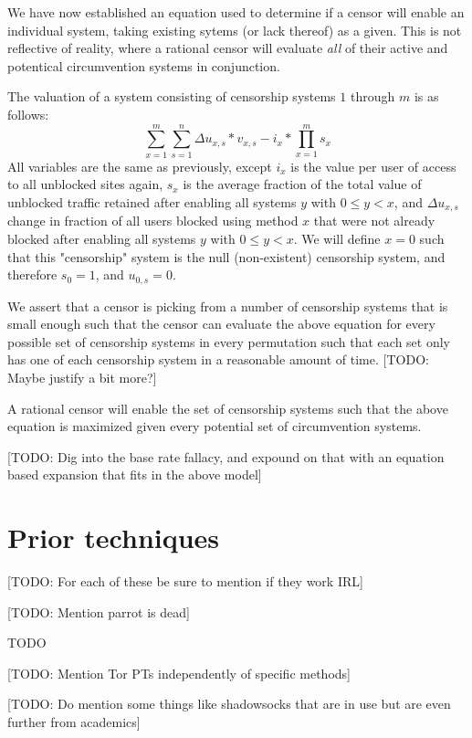 \documentclass[12pt]{report}
\begin{document}
We have now established an equation used to determine if a censor will enable an individual system, taking existing sytems (or lack thereof) as a given. This is not reflective of reality, where a rational censor will evaluate \emph{all} of their active and potentical circumvention systems in conjunction.

The valuation of a system consisting of censorship systems $1$ through $m$ is as follows:
\begin{equation}
\sum_{x=1}^{m}\sum_{s=1}^{n}\Delta u_{x,s}*v_{x,s} - i_{x} * \prod_{x=1}^{m}s_x
\end{equation}
All variables are the same as previously, except $i_x$ is the value per user of access to all unblocked sites again, $s_x$ is the average fraction of the total value of unblocked traffic retained after enabling all systems $y$ with $0\leq y<x$, and $\Delta  u_{x,s}$ change in fraction of all users blocked using method $x$ that were not already blocked after enabling all systems $y$ with $0\leq y<x$. We will define $x=0$ such that this "censorship" system is the null (non-existent) censorship system, and therefore $s_0 = 1$, and $u_{0,s} = 0$.

We assert that a censor is picking from a number of censorship systems that is small enough such that the censor can evaluate the above equation for every possible set of censorship systems in every permutation such that each set only has one of each censorship system in a reasonable amount of time. [TODO: Maybe justify a bit more?]

A rational censor will enable the set of censorship systems such that the above equation is maximized given every potential set of circumvention systems.

[TODO: Dig into the base rate fallacy, and expound on that with an equation based expansion that fits in the above model]

\section{Prior techniques}

[TODO: For each of these be sure to mention if they work IRL]

[TODO: Mention parrot is dead]

TODO

[TODO: Mention Tor PTs independently of specific methods]

[TODO: Do mention some things like shadowsocks that are in use but are even further from academics]
\end{document}
